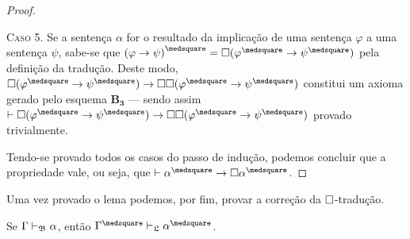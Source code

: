 \begin{lemma}
\begin{proof}
            \begin{case}
                \textsc{Caso 5.}
                Se a sentença $\alpha$ for o resultado da implicação de uma sentença $\varphi$ a uma sentença $\psi$, sabe-se que ${(\varphi\to\psi)}^\medsquare=\nec(\varphi^\medsquare\to\psi^\medsquare)$ pela definição da tradução.
                Deste modo, $\nec(\varphi^\medsquare\to\psi^\medsquare)\to\nec\nec(\varphi^\medsquare\to\psi^\medsquare)$ constitui um axioma gerado pelo esquema \hyperref[MB3]{$\mathbf{B_3}$} --- sendo assim $\entails\nec(\varphi^\medsquare\to\psi^\medsquare)\to\nec\nec(\varphi^\medsquare\to\psi^\medsquare)$ provado trivialmente.
            \end{case}
            \vspace{.5\baselineskip}
            Tendo-se provado todos os casos do passo de indução, podemos concluir que a propriedade vale, ou seja, que $\entails\alpha^\medsquare\to\nec\alpha^\medsquare$.
        \end{proof}
    \end{lemma}

    Uma vez provado o lema podemos, por fim, provar a correção da $\Box$-tradução.

    \begin{theorem}\label{square-correctness}
        Se $\Gamma\mathrel{\vdash}_\mathfrak{B}\alpha$, então $\Gamma^\medsquare\entails_\mathfrak{L}\alpha^\medsquare$.
    \end{theorem}

